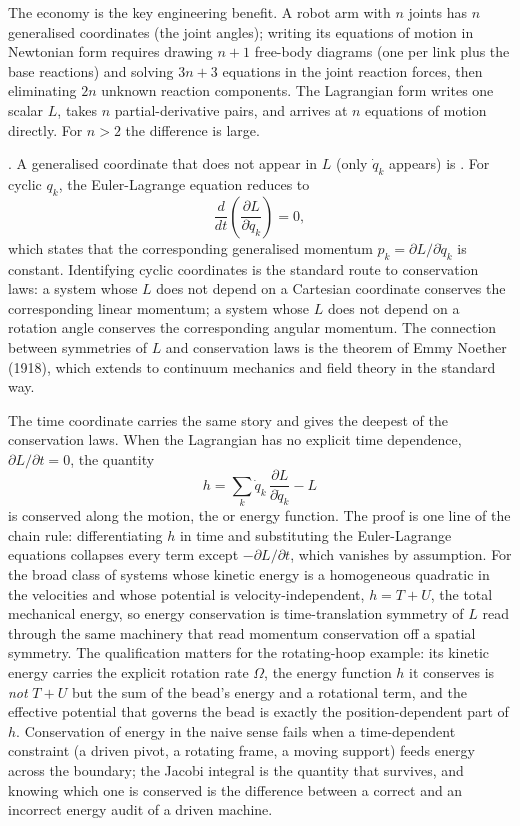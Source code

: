 The economy is the key engineering benefit. A robot arm with $n$
joints has $n$ generalised coordinates (the joint angles); writing
its equations of motion in Newtonian form requires drawing $n + 1$
free-body diagrams (one per link plus the base reactions) and solving
$3n + 3$ equations in the joint reaction forces, then eliminating
$2n$ unknown reaction components. The Lagrangian form writes one
scalar $L$, takes $n$ partial-derivative pairs, and arrives at $n$
equations of motion directly. For $n > 2$ the difference is large.

. A generalised
coordinate that does not appear in $L$ (only $\dot{q}_k$ appears) is
. For cyclic $q_k$, the Euler-Lagrange equation
reduces to
\[
\frac{d}{dt}\left(\frac{\partial L}{\partial \dot{q}_k}\right) = 0,
\]
which states that the corresponding generalised momentum $p_k =
\partial L / \partial \dot{q}_k$ is constant. Identifying cyclic
coordinates is the standard route to conservation laws: a system
whose $L$ does not depend on a Cartesian coordinate conserves the
corresponding linear momentum; a system whose $L$ does not depend on
a rotation angle conserves the corresponding angular momentum. The
connection between symmetries of $L$ and conservation laws is the
theorem of Emmy Noether (1918), which extends to continuum mechanics
and field theory in the standard way.

The time coordinate carries the same story and gives the deepest of the
conservation laws. When the Lagrangian has no explicit time dependence,
$\partial L/\partial t = 0$, the quantity
\[
h = \sum_k \dot q_k\,\frac{\partial L}{\partial\dot q_k} - L
\]
is conserved along the motion, the  or energy
function. The proof is one line of the chain rule: differentiating $h$ in time
and substituting the Euler-Lagrange equations collapses every term except
$-\partial L/\partial t$, which vanishes by assumption. For the broad class of
systems whose kinetic energy is a homogeneous quadratic in the velocities and
whose potential is velocity-independent, $h = T + U$, the total mechanical
energy, so energy conservation is time-translation symmetry of $L$ read through
the same machinery that read momentum conservation off a spatial symmetry. The
qualification matters for the rotating-hoop example: its kinetic energy carries
the explicit rotation rate $\Omega$, the energy function $h$ it conserves is
\emph{not} $T + U$ but the sum of the bead's energy and a rotational term, and
the effective potential that governs the bead is exactly the position-dependent
part of $h$. Conservation of energy in the naive sense fails when a
time-dependent constraint (a driven pivot, a rotating frame, a moving support)
feeds energy across the boundary; the Jacobi integral is the quantity that
survives, and knowing which one is conserved is the difference between a
correct and an incorrect energy audit of a driven machine.

